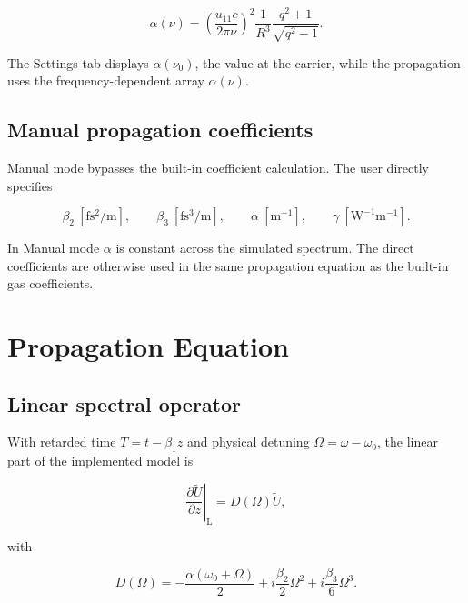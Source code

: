 \documentclass[11pt,a4paper]{article}
\begin{document}
\begin{equation}
\boxed{
\alpha(\nu)
=
\left(\frac{u_{11}c}{2\pi\nu}\right)^2
\frac{1}{R^3}
\frac{q^2+1}{\sqrt{q^2-1}}.
}
\end{equation}

The Settings tab displays $\alpha(\nu_0)$, the value at the carrier, while the
propagation uses the frequency-dependent array $\alpha(\nu)$.

\subsection{Manual propagation coefficients}

Manual mode bypasses the built-in coefficient calculation. The user directly
specifies

\begin{equation}
\beta_2\ [\mathrm{fs^2/m}],\qquad
\beta_3\ [\mathrm{fs^3/m}],\qquad
\alpha\ [\mathrm{m^{-1}}],\qquad
\gamma\ [\mathrm{W^{-1}m^{-1}}].
\end{equation}

In Manual mode $\alpha$ is constant across the simulated spectrum. The direct
coefficients are otherwise used in the same propagation equation as the
built-in gas coefficients.

\section{Propagation Equation}

\subsection{Linear spectral operator}

With retarded time $T=t-\beta_1z$ and physical detuning
$\Omega=\omega-\omega_0$, the linear part of the implemented model is

\begin{equation}
\boxed{
\left.
\frac{\partial\widetilde U}{\partial z}
\right|_{\mathrm L}
=
D(\Omega)\widetilde U,
}
\end{equation}

with

\begin{equation}
\boxed{
D(\Omega)
=
-\frac{\alpha(\omega_0+\Omega)}{2}
+i\frac{\beta_2}{2}\Omega^2
+i\frac{\beta_3}{6}\Omega^3.
}
\end{equation}
\end{document}
